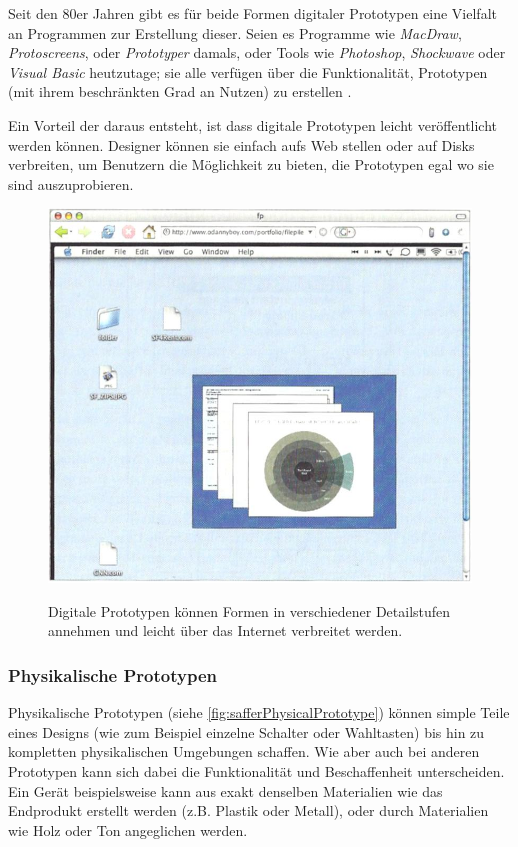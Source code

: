 Seit den 80er Jahren gibt es für beide Formen digitaler Prototypen eine Vielfalt an Programmen zur Erstellung dieser. Seien es Programme wie \emph{MacDraw}, \emph{Protoscreens}, oder \emph{Prototyper} damals, oder Tools wie \emph{Photoshop}, \emph{Shockwave} oder \emph{Visual Basic} heutzutage; sie alle verfügen über die Funktionalität, Prototypen (mit ihrem beschränkten Grad an Nutzen) zu erstellen \citep{Miller-Jacobs:1991}. 

Ein Vorteil der daraus entsteht, ist dass digitale Prototypen leicht veröffentlicht werden können. Designer können sie einfach aufs Web stellen oder auf Disks verbreiten, um Benutzern die Möglichkeit zu bieten, die Prototypen egal wo sie sind auszuprobieren. 

\begin{figure}
	\begin{center}
        {\includegraphics[width=\linewidth]{gfx/safferDigitalPrototype}}
	\end{center}
		\caption[Digitale Prototypen. \newline \citep{Saffer:2007}]{Digitale Prototypen können Formen in verschiedener Detailstufen annehmen und leicht über das Internet verbreitet werden.}\label{fig:safferDigitalPrototype}
\end{figure}

\subsubsection{Physikalische Prototypen} 
Physikalische Prototypen (siehe \autoref{fig:safferPhysicalPrototype}) können simple Teile eines Designs (wie zum Beispiel einzelne Schalter oder Wahltasten) bis hin zu kompletten physikalischen Umgebungen schaffen. Wie aber auch bei anderen Prototypen kann sich dabei die Funktionalität und Beschaffenheit unterscheiden. Ein Gerät beispielsweise kann aus exakt denselben Materialien wie das Endprodukt erstellt werden (z.B. Plastik oder Metall), oder durch Materialien wie Holz oder Ton angeglichen werden. 


